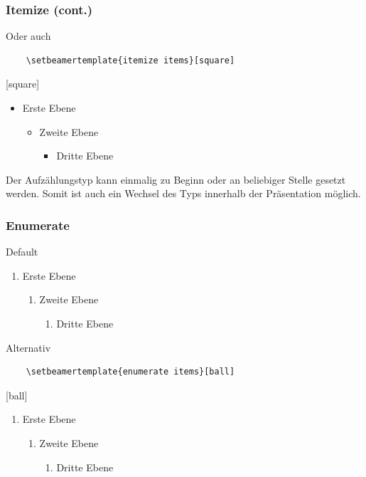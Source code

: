 \documentclass[table,hyperref={bookmarksopen=false}]{beamer}
\begin{document}
\begin{frame}[fragile]
  \frametitle{Itemize (cont.)}
  \begin{block}{Oder auch}\vspace*{-3mm}
  \begin{verbatim}
    \setbeamertemplate{itemize items}[square]
  \end{verbatim}\vspace*{-3mm}
  [square]
  \begin{itemize}
    \item Erste Ebene
    \begin{itemize}
      \item Zweite Ebene
      \begin{itemize}
        \item Dritte Ebene
      \end{itemize}
    \end{itemize}
  \end{itemize}
  \end{block}
  Der Aufzählungstyp kann einmalig zu Beginn oder an beliebiger Stelle gesetzt werden. Somit ist auch ein Wechsel des Typs innerhalb der Präsentation möglich.
\end{frame}

\begin{frame}[fragile]
  \frametitle{Enumerate}
  \begin{block}{Default}
  \begin{enumerate}
    \item Erste Ebene
    \begin{enumerate}
      \item Zweite Ebene
      \begin{enumerate}
        \item Dritte Ebene
      \end{enumerate}
    \end{enumerate}
  \end{enumerate}
  \end{block}
  \begin{block}{Alternativ}\vspace*{-3mm}
  \begin{verbatim}
    \setbeamertemplate{enumerate items}[ball]
  \end{verbatim}\vspace*{-3mm}
  [ball]
  \begin{enumerate}
    \item Erste Ebene
    \begin{enumerate}
      \item Zweite Ebene
      \begin{enumerate}
        \item Dritte Ebene
      \end{enumerate}
    \end{enumerate}
  \end{enumerate}
  \end{block}
\end{frame}
\end{document}
